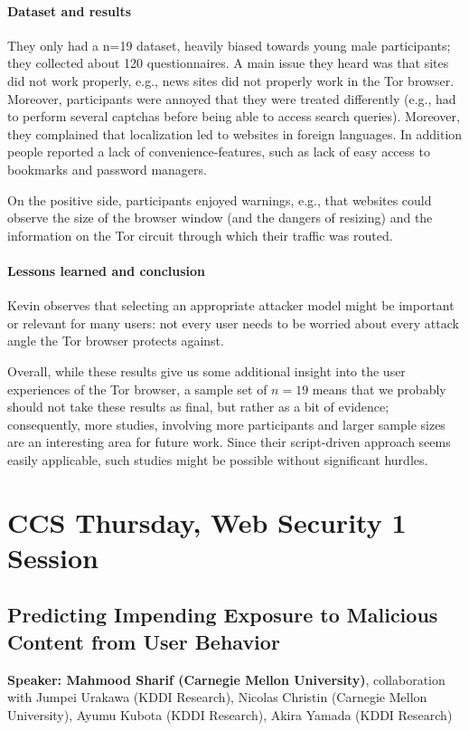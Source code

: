 \documentclass{article}
\begin{document}
\paragraph{Dataset and results} They only had a n=19 dataset, heavily biased towards young male participants; they collected about 120 questionnaires.
A main issue they heard was that sites did not work properly, e.g., news sites did not properly work in the Tor browser. Moreover, participants were annoyed that they were treated differently (e.g., had to perform several captchas before being able to access search queries). Moreover, they complained that localization led to websites in foreign languages. In addition people reported a lack of convenience-features, such as lack of easy access to bookmarks and password managers.

On the positive side, participants enjoyed warnings, e.g., that websites could observe the size of the browser window (and the dangers of resizing) and the information on the Tor circuit through which their traffic was routed.

\paragraph{Lessons learned and conclusion}
Kevin observes that selecting an appropriate attacker model might be important or relevant for many users: not every user needs to be worried about every attack angle the Tor browser protects against.

Overall, while these results give us some additional insight into the user experiences of the Tor browser, a sample set of $n=19$ means that we probably should not take these results as final, but rather as a bit of evidence; consequently, more studies, involving more participants and larger sample sizes are an interesting area for future work. Since their script-driven approach seems  easily applicable, such studies might be possible without significant hurdles.



\section{CCS Thursday, Web Security 1 Session}
\subsection{Predicting Impending Exposure to Malicious Content from User Behavior}
\noindent\textbf{Speaker: Mahmood Sharif (Carnegie Mellon University)}, collaboration with Jumpei Urakawa (KDDI Research), Nicolas Christin (Carnegie Mellon University), Ayumu Kubota (KDDI Research), Akira Yamada (KDDI Research)
\end{document}
